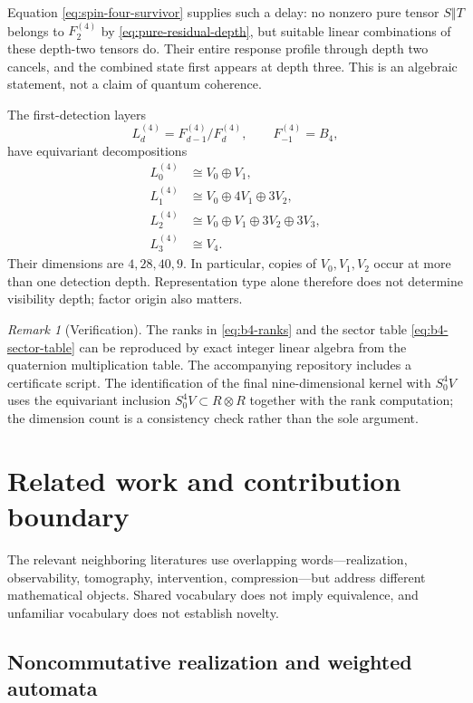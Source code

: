 \documentclass[11pt]{article}
\theoremstyle{definition}
\theoremstyle{remark}
\newtheorem{remark}[theorem]{Remark}
\newcommand{\concat}{\mathbin{\Vert}}
\begin{document}
Equation \eqref{eq:spin-four-survivor} supplies such a delay: no nonzero pure tensor $S\concat T$ belongs to $F_2^{(4)}$ by \eqref{eq:pure-residual-depth}, but suitable linear combinations of these depth-two tensors do.  Their entire response profile through depth two cancels, and the combined state first appears at depth three.  This is an algebraic statement, not a claim of quantum coherence.

The first-detection layers
\[
  L_d^{(4)}=F_{d-1}^{(4)}/F_d^{(4)},
  \qquad F_{-1}^{(4)}=B_4,
\]
have equivariant decompositions
\begin{equation}\label{eq:layers}
\begin{aligned}
 L_0^{(4)}&\cong V_0\oplus V_1,\\
 L_1^{(4)}&\cong V_0\oplus4V_1\oplus3V_2,\\
 L_2^{(4)}&\cong V_0\oplus V_1\oplus3V_2\oplus3V_3,\\
 L_3^{(4)}&\cong V_4.
\end{aligned}
\end{equation}
Their dimensions are $4,28,40,9$.  In particular, copies of $V_0,V_1,V_2$ occur at more than one detection depth.  Representation type alone therefore does not determine visibility depth; factor origin also matters.

\begin{remark}[Verification]
The ranks in \eqref{eq:b4-ranks} and the sector table \eqref{eq:b4-sector-table} can be reproduced by exact integer linear algebra from the quaternion multiplication table.  The accompanying repository includes a certificate script.  The identification of the final nine-dimensional kernel with $S^4_0V$ uses the equivariant inclusion $S^4_0V\subset R\otimes R$ together with the rank computation; the dimension count is a consistency check rather than the sole argument.
\end{remark}

\section{Related work and contribution boundary}\label{sec:related}

The relevant neighboring literatures use overlapping words---realization, observability, tomography, intervention, compression---but address different mathematical objects.  Shared vocabulary does not imply equivalence, and unfamiliar vocabulary does not establish novelty.

\subsection{Noncommutative realization and weighted automata}
\end{document}
